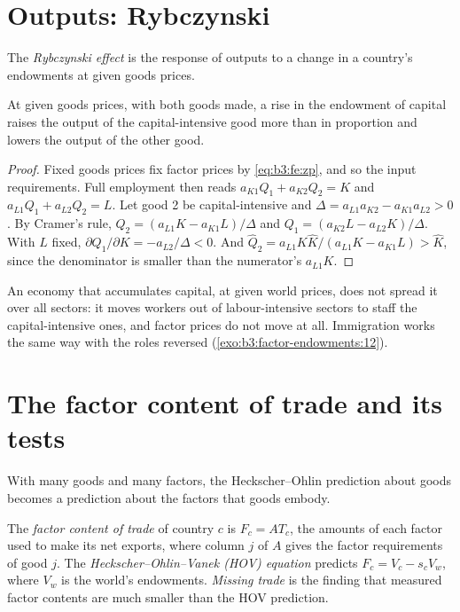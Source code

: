 \section{Outputs: Rybczynski}\label{sec:b3:factor-endowments:rybczynski}

\begin{definition}\label{def:b3:factor-endowments:rybczynski}
The \emph{Rybczynski effect} is the response of outputs to a change in a
country's endowments at given goods prices.
\end{definition}

\begin{proposition}\label{prop:b3:factor-endowments:rybczynski}
At given goods prices, with both goods made, a rise in the endowment of capital
raises the output of the capital-intensive good more than in proportion and
lowers the output of the other good.
\end{proposition}

\begin{proof}
Fixed goods prices fix factor prices by \eqref{eq:b3:fe:zp}, and so the input
requirements. Full employment then reads $a_{K1}Q_1 + a_{K2}Q_2 = K$ and $a_{L1}Q_1 +
a_{L2}Q_2 = L$. Let good 2 be capital-intensive and $\Delta = a_{L1}a_{K2} -
a_{K1}a_{L2} > 0$. By Cramer's rule, $Q_2 = (a_{L1}K - a_{K1}L)/\Delta$ and $Q_1 = (a_{K2}L -
a_{L2}K)/\Delta$. With $L$ fixed, $\partial Q_1/\partial K = -a_{L2}/\Delta < 0$. And
$\hat Q_2 = a_{L1}K\hat K/(a_{L1}K - a_{K1}L) > \hat K$, since the denominator is smaller
than the numerator's $a_{L1}K$.
\end{proof}

An economy that accumulates capital, at given world prices, does not spread it
over all sectors: it moves workers out of labour-intensive sectors to staff the
capital-intensive ones, and factor prices do not move at all. Immigration works
the same way with the roles reversed (\cref{exo:b3:factor-endowments:12}).

\section{The factor content of trade and its tests}\label{sec:b3:factor-endowments:content}

With many goods and many factors, the Heckscher--Ohlin prediction about goods
becomes a prediction about the factors that goods embody.

\begin{definition}\label{def:b3:factor-endowments:factor-content}
The \emph{factor content of trade} of country $c$ is $F_c = A T_c$, the amounts
of each factor used to make its net exports, where column $j$ of $A$ gives the
factor requirements of good $j$. The \emph{Heckscher--Ohlin--Vanek (HOV)
equation} predicts $F_c = V_c - s_c V_w$, where $V_w$ is the world's endowments.
\emph{Missing trade} is the finding that measured factor contents are much
smaller than the HOV prediction.
\end{definition}

